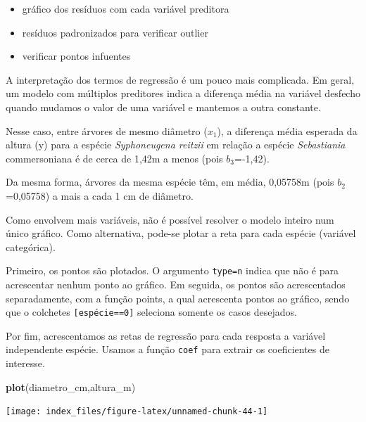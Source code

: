 \documentclass[12pt,brazil,oneside]{book}
\newenvironment{Shaded}{\begin{snugshade}}{\end{snugshade}}
\newcommand{\KeywordTok}[1]{\textcolor[rgb]{0.13,0.29,0.53}{\textbf{#1}}}
\newcommand{\NormalTok}[1]{#1}
\providecommand{\tightlist}{%
  \setlength{\itemsep}{0pt}\setlength{\parskip}{0pt}}
\begin{document}
\begin{itemize}
\tightlist
\item
  gráfico dos resíduos com cada variável preditora
\item
  resíduos padronizados para verificar outlier
\item
  verificar pontos infuentes
\end{itemize}

A interpretação dos termos de regressão é um pouco mais complicada. Em geral, um modelo com múltiplos preditores indica a diferença média na variável desfecho quando mudamos o valor de uma variável e mantemos a outra constante.

Nesse caso, entre árvores de mesmo diâmetro (\(x_1\)), a diferença média esperada da altura (y) para a espécie \emph{Syphoneugena reitzii} em relação a espécie \emph{Sebastiania} commersoniana é de cerca de 1,42m a menos (pois \(b_3\)=-1,42).

Da mesma forma, árvores da mesma espécie têm, em média, 0,05758m (pois \(b_2\)=0,05758) a mais a cada 1 cm de diâmetro.

Como envolvem mais variáveis, não é possível resolver o modelo inteiro num único gráfico. Como alternativa, pode-se plotar a reta para cada espécie (variável categórica).

Primeiro, os pontos são plotados. O argumento \texttt{type=\textquotesingle{}n\textquotesingle{}} indica que não é para acrescentar nenhum ponto ao gráfico.
Em seguida, os pontos são acrescentados separadamente, com a função points, a qual acrescenta pontos ao gráfico, sendo que o colchetes \texttt{{[}espécie==0{]}} seleciona somente os casos desejados.

Por fim, acrescentamos as retas de regressão para cada resposta a variável independente espécie. Usamos a função \texttt{coef} para extrair os coeficientes de interesse.

\begin{Shaded}
\begin{Highlighting}[]
\KeywordTok{plot}\NormalTok{(diametro_cm,altura_m)}
\end{Highlighting}
\end{Shaded}

\begin{center}\texttt{[image: index\_files/figure-latex/unnamed-chunk-44-1]} \end{center}
\end{document}
